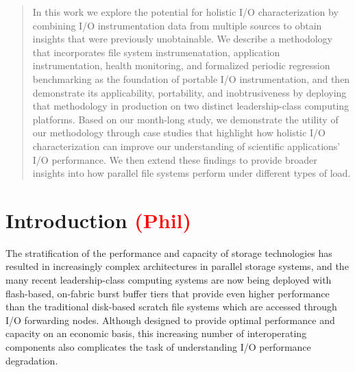 \documentclass[conference,10pt,compsocconf]{IEEEtran}
\newcommand{\assign}[1]{\textcolor{red}{(#1)}}
\begin{document}
\begin{abstract}
In this work we explore the potential for holistic I/O characterization
by combining I/O instrumentation data from multiple sources to obtain
insights that were previously unobtainable. We describe a methodology that
incorporates file system instrumenatation, application instrumentation,
health monitoring, and formalized periodic regression benchmarking as
the foundation of portable I/O instrumentation, and then demonstrate
its applicability, portability, and inobtrusiveness by deploying that
methodology in production on two distinct leadership-class computing
platforms. Based on our month-long study, we demonstrate the utility of our
methodology through case studies that highlight how holistic I/O
characterization can improve our understanding of scientific applications'
I/O performance. We then extend these findings to provide broader insights
into how parallel file systems perform under different types of load.

\end{abstract}

\section{Introduction \assign{Phil}} \label{introduction}



The stratification of the performance and capacity of storage technologies has
resulted in increasingly complex architectures in parallel storage systems, and
the many recent leadership-class computing systems are now being deployed with
flash-based, on-fabric burst buffer tiers\cite{Henseler2016} that provide even higher performance
than the traditional disk-based scratch file systems which are accessed through
I/O forwarding nodes\cite{Bhimji2016}.  Although designed to provide optimal performance and
capacity on an economic basis, this increasing number of interoperating
components also complicates the task of understanding I/O performance
degradation.

\end{document}
